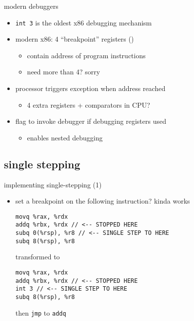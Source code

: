 \begin{frame}{modern debuggers}
    \begin{itemize}
    \item {\tt int 3} is the oldest x86 debugging mechanism
    \item modern x86: 4 ``breakpoint'' registers ()
        \begin{itemize}
        \item contain address of program instructions
        \item need more than 4? sorry
        \end{itemize}
    \item processor triggers exception when address reached
        \begin{itemize}
        \item 4 extra registers + comparators in CPU?
        \end{itemize}
    \item flag to invoke debugger if debugging registers used
        \begin{itemize}
        \item enables nested debugging
        \end{itemize}
    \end{itemize}
\end{frame}

\subsection{single stepping}


\begin{frame}[fragile,label=implSingleStep]{implementing single-stepping (1)}
\lstset{language=myasm,style=small}
\begin{itemize}
\item set a breakpoint on the following instruction? kinda works
\begin{lstlisting}
movq %rax, %rdx
addq %rbx, %rdx // <-- STOPPED HERE
subq 0(%rsp), %r8 // <-- SINGLE STEP TO HERE
subq 8(%rsp), %r8
\end{lstlisting}
transformed to
\begin{lstlisting}
movq %rax, %rdx
addq %rbx, %rdx // <-- STOPPED HERE
int 3 // <-- SINGLE STEP TO HERE
subq 8(%rsp), %r8
\end{lstlisting}
then {\tt jmp} to {\tt addq}
\end{itemize}
\end{frame}

